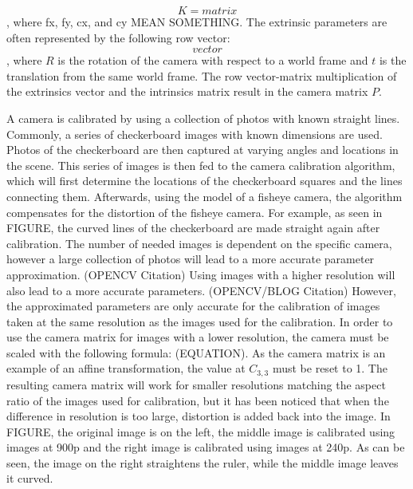 \documentclass[arbeit=studie,oneside,BCOR=12mm]{ArbeitRST}
\begin{document}
$$K = matrix$$, where fx, fy, cx, and cy MEAN SOMETHING. The extrinsic
parameters are often represented by the following row vector:
$$vector$$, where $R$ is the rotation of the camera with respect to a world 
frame and $t$ is the translation from the same world frame. The row 
vector-matrix multiplication of the extrinsics vector and the intrinsics matrix
result in the camera matrix $P$.

A camera is calibrated by using a collection of photos with known straight 
lines. Commonly, a series of checkerboard images with known dimensions are used. 
Photos of the checkerboard are then captured at varying angles and locations in 
the scene. This series of images is then fed to the camera calibration 
algorithm, which will first determine the locations of the checkerboard squares
and the lines connecting them.  Afterwards, using the model of a fisheye camera,
the algorithm 
compensates for the distortion of the fisheye camera. 
For example, as seen in FIGURE, the curved lines of the checkerboard are made 
straight again after calibration. The number of needed images is dependent on 
the specific camera, however a large collection of photos will lead to a more 
accurate parameter approximation. (OPENCV Citation) Using images with a higher 
resolution will also lead to a more accurate parameters. (OPENCV/BLOG Citation)
However, the approximated parameters are only accurate for the calibration of 
images taken at the same resolution as the images used for the calibration. In
order to use the camera matrix for images with a lower resolution, the camera 
must be scaled with the following formula:
(EQUATION). As the camera matrix is an example of an affine transformation, the
value at $C_{3, 3}$ must be reset to 1.
The resulting camera matrix will work for smaller resolutions matching the 
aspect ratio of the images used for calibration, but it has been noticed that 
when the difference in resolution is too large, distortion is added back into 
the image. In FIGURE, the original image is on the left, the middle image is 
calibrated using images at 900p and the right image is calibrated using images 
at 240p. As can be seen, the image on the right straightens the ruler, while 
the middle image leaves it curved.
\end{document}
